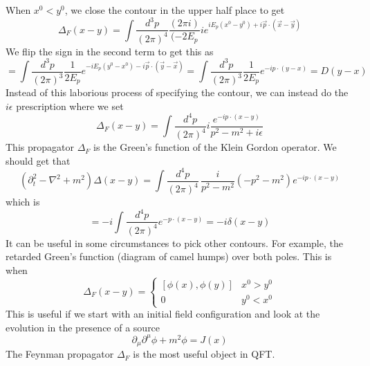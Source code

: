 When $ x^0  < y^0 $, we close the contour in the upper half place to get
\[
\Delta_F( x -y)  = \int \frac{d^ 3 p }{ ( 2 \pi )^ 4 } \frac{ ( 2 \pi i ) }{ (  - 2 E_p } i e^{ i E_p ( x^ 0 - y ^ 0 ) + i \vec{p} \cdot  ( \vec{x} - \vec{y} ) }
\] We flip the sign in the second term to get this as 
\[
= \int \frac{d^ 3 p }{ ( 2 \pi )^ 3 } \frac{1}{ 2 E_p } e^{ - i E_p ( y^0 - x^0 )  - i \vec{p} \cdot  ( \vec{y} - \vec{x} ) } = \int \frac{d^ 3 p }{ ( 2 \pi ) ^ 3 } \frac{1}{2 E_p } e^{  - i p \cdot  ( y - x ) } = D( y - x) 
\] Instead of this laborious process of specifying the contour, 
we can instead do the $ i \epsilon $ prescription where we set 
\[
\Delta_F ( x -y )  = \int \frac{d^ 4 p }{ ( 2 \pi )^ 4 } i \frac{ e^{  - i p \cdot  ( x - y ) }}{p^ 2 - m^2 + i \epsilon }
\] This propagator $ \Delta_ F$ is the Green's function of the Klein Gordon operator. 
We should get that 
\[
( \partial_t^ 2  - \nabla^2 + m^2 ) \Delta( x - y )   = \int \frac{d^4 p }{ ( 2 \pi )^ 4} \, \frac{i}{p^2 - m ^2 } ( - p^2  - m^ 2 ) e^{  -i p \cdot  ( x- y ) } 	
\] which is 
\[
= - i \int \frac{d^ 4 p }{ ( 2 \pi ) ^ 4 } e^{  - p \cdot  ( x -y ) } = - i \delta ( x- y ) 
\] It can be useful in some circumstances to pick other contours. 
For example, the retarded Green's function (diagram of camel humps) 
over both poles. This is when 
\[
\Delta_F( x -y )  = \begin{cases}
[ \phi ( x), \phi( y ) ] & x^0 > y ^ 0 \\
0 & y^0 < x^0 
\end{cases}
\] This is useful if we start with an initial field configuration and look 
at the evolution in the presence of a 
source 
\[
\partial_\mu \partial^\mu \phi + m^2 \phi = J ( x) 
\] The Feynman propagator $\Delta_F$ is the most useful object in QFT.    




\pagebreak 
